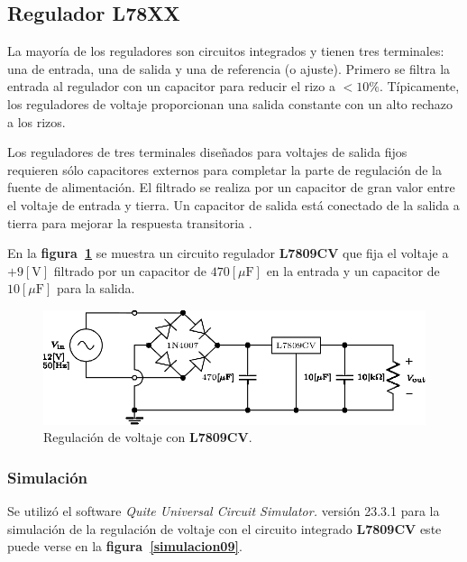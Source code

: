 \subsection{Regulador L78XX}
La mayoría de los reguladores son circuitos integrados y tienen tres terminales:
una de entrada, una de salida y una de referencia (o ajuste). Primero se filtra
la entrada al regulador con un capacitor para reducir el rizo a $<10\%$.
Típicamente, los reguladores de voltaje proporcionan una salida constante con un
alto rechazo a los rizos.

Los reguladores de tres terminales diseñados para voltajes de salida fijos
requieren sólo capacitores externos para completar la parte de regulación de la
fuente de alimentación. El filtrado se realiza por un capacitor de gran valor
entre el voltaje de entrada y tierra. Un capacitor de salida está conectado de
la salida a tierra para mejorar la respuesta transitoria \cite{Floyd}.

En la \textbf{figura~\ref{circuito09}} se muestra un circuito regulador
\textbf{L7809CV} que fija el voltaje a $+9[\text{V}]$ filtrado por un capacitor
de $470[\mu\text{F}]$ en la entrada y un capacitor de $10[\mu\text{F}]$ para la
salida.

\begin{figure}[!h]
\centering
\includegraphics[scale=1.1]{diagramas/09.regulador1.eps}
\caption{Regulación de voltaje con \textbf{L7809CV}.}
\label{circuito09}
\end{figure}

\subsubsection{Simulación}
Se utilizó el software \emph{Quite Universal Circuit Simulator.} versión 23.3.1
para la simulación de la regulación de voltaje con el circuito integrado
\textbf{L7809CV} este puede verse en la \textbf{figura~\ref{simulacion09}}.

